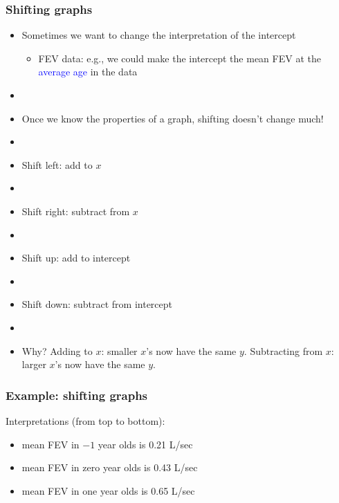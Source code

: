 \documentclass[11pt]{beamer}
\newcommand{\myframe}[1]{\begin{frame} \frametitle{#1}}
\newenvironment{spaceitemize}
{ \begin{itemize}
    \setlength{\itemsep}{10pt}
    \setlength{\parskip}{0pt}
    \setlength{\parsep}{0pt}     }
{ \end{itemize}                  }
\begin{document}
\myframe{Shifting graphs}
\begin{itemize}
\item Sometimes we want to change the interpretation of the intercept
\begin{itemize}
\item FEV data: e.g., we could make the intercept the mean FEV at the \textcolor{blue}{average age} in the data
\end{itemize}
\item[]
\item Once we know the properties of a graph, shifting doesn't change much!
\item[]
\item Shift left: add to $x$
\item[]
\item Shift right: subtract from $x$
\item[]
\item Shift up: add to intercept
\item[]
\item Shift down: subtract from intercept
\item[]
\item Why? Adding to $x$: smaller $x$'s now have the same $y$. Subtracting from $x$: larger $x$'s now have the same $y$.
\end{itemize}
\end{frame}

\myframe{Example: shifting graphs}
{\centering
{}
}

\scriptsize
Interpretations (from top to bottom): 
\begin{spaceitemize}
\item mean FEV in $-1$ year olds is 0.21 L/sec
\item mean FEV in zero year olds is 0.43 L/sec
\item mean FEV in one year olds is 0.65 L/sec
\end{spaceitemize} 
\end{frame}
\end{document}
